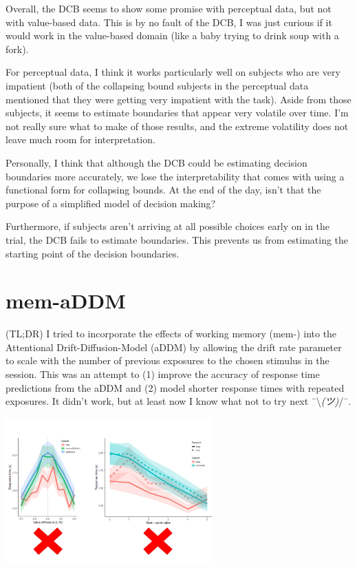 \documentclass[
]{book}
\begin{document}
Overall, the DCB seems to show some promise with perceptual data, but not with value-based data. This is by no fault of the DCB, I was just curious if it would work in the value-based domain (like a baby trying to drink soup with a fork).

For perceptual data, I think it works particularly well on subjects who are very impatient (both of the collapsing bound subjects in the perceptual data mentioned that they were getting very impatient with the task). Aside from those subjects, it seems to estimate boundaries that appear very volatile over time. I'm not really sure what to make of those results, and the extreme volatility does not leave much room for interpretation.

Personally, I think that although the DCB could be estimating decision boundaries more accurately, we lose the interpretability that comes with using a functional form for collapsing bounds. At the end of the day, isn't that the purpose of a simplified model of decision making?

Furthermore, if subjects aren't arriving at all possible choices early on in the trial, the DCB fails to estimate boundaries. This prevents us from estimating the starting point of the decision boundaries.

\hypertarget{mem-aDDM}{%
\chapter{mem-aDDM}\label{mem-aDDM}}

(TL;DR) I tried to incorporate the effects of working memory (mem-) into the Attentional Drift-Diffusion-Model (aDDM) by allowing the drift rate parameter to scale with the number of previous exposures to the chosen stimulus in the session. This was an attempt to (1) improve the accuracy of response time predictions from the aDDM and (2) model shorter response times with repeated exposures. It didn't work, but at least now I know what not to try next ¯\textbackslash{}\emph{(ツ)}/¯.

\includegraphics[width=0.6\textwidth,height=\textheight]{images/mem-aDDM-rt-results.PNG}
\end{document}
